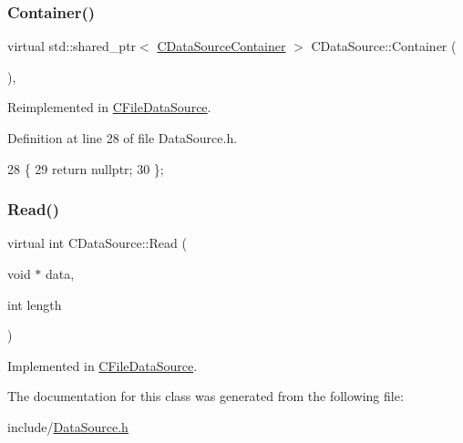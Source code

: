 \subsubsection{\texorpdfstring{Container()}{Container()}}
{\footnotesize\ttfamily virtual std\+::shared\+\_\+ptr$<$ \hyperlink{classCDataSourceContainer}{C\+Data\+Source\+Container} $>$ C\+Data\+Source\+::\+Container (\begin{DoxyParamCaption}{ }\end{DoxyParamCaption})\hspace{0.3cm}{\ttfamily [inline]}, {\ttfamily [virtual]}}



Reimplemented in \hyperlink{classCFileDataSource_a2492b88ea8186c4cbd4bdfa92060f5fa}{C\+File\+Data\+Source}.



Definition at line 28 of file Data\+Source.\+h.


\begin{DoxyCode}
28                                                                  \{
29             \textcolor{keywordflow}{return} \textcolor{keyword}{nullptr};
30         \};
\end{DoxyCode}
\hypertarget{classCDataSource_ad94adc5076f973dcce83b73395eec86b}{}\label{classCDataSource_ad94adc5076f973dcce83b73395eec86b} 
\subsubsection{\texorpdfstring{Read()}{Read()}}
{\footnotesize\ttfamily virtual int C\+Data\+Source\+::\+Read (\begin{DoxyParamCaption}\item[{void $\ast$}]{data,  }\item[{int}]{length }\end{DoxyParamCaption})\hspace{0.3cm}{\ttfamily [pure virtual]}}



Implemented in \hyperlink{classCFileDataSource_a97b9c7b8904aecbe7b0e8797508265fd}{C\+File\+Data\+Source}.



The documentation for this class was generated from the following file\+:\begin{DoxyCompactItemize}
\item 
include/\hyperlink{DataSource_8h}{Data\+Source.\+h}\end{DoxyCompactItemize}
